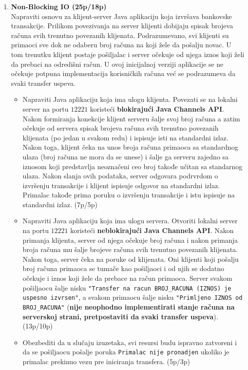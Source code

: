 \documentclass[]{article}
\begin{document}
\begin{enumerate}
\item \textbf{Non-Blocking IO (25p/18p)}
\\Napraviti osnovu za klijent-server Java aplikaciju koja izvr\v{s}ava bankovske transakcije. Prilikom povezivanja na server klijenti dobijaju spisak brojeva ra\v{c}una svih trenutno povezanih klijenata. Podrazumevano, svi klijenti su primaoci sve dok ne odaberu broj ra\v{c}una na koji \v{z}ele da po\v{s}alju novac. U tom trenutku klijent postaje po\v{s}iljalac i server o\v{c}ekuje od njega iznos koji \v{z}eli da prebaci na odredi\v{s}ni ra\v{c}un. U ovoj inicijalnoj verziji aplikacije se ne o\v{c}ekuje potpuna implementacija korisni\v{c}kih ra\v{c}una ve\'c{} se podrazumeva da svaki transfer uspeva.

\begin{itemize}
  \item Napraviti Java aplikaciju koja ima ulogu klijenta. Povezati se na lokalni server na portu $12221$ koristeći \textbf{blokiraju\'c{}i Java Channels API}. Nakon formiranja konekcije klijent serveru \v{s}alje svoj broj ra\v{c}una a zatim o\v{c}ekuje od servera spisak brojeva ra\v{c}una svih trenutno povezanih klijenata (po jedan u svakom redu) i ispisuje isti na standardni izlaz. Nakon toga, klijent \v{c}eka na unos broja ra\v{c}una primaoca sa standardnog ulaza (broj ra\v{c}una ne mora da se unese) i \v{s}alje ga serveru zajedno sa iznosom koji predstavlja neozna\v{c}eni ceo broj takođe u\v{c}itan sa standarnog ulaza. Nakon slanja ovih podataka, server odgovara podrvrdom o izvr\v{s}enju transakcije i klijent ispisuje odgovor na standardni izlaz. Primalac takođe prima poruku o izvr\v{s}enju transakcije i istu ispisuje na standardni izlaz. \hfill (7p/5p)
  \item Napraviti Java aplikaciju koja ima ulogu servera. Otvoriti lokalni server na portu $12221$ koristeći \textbf{neblokiraju\'c{}i Java Channels API}. Nakon primanja klijenta, server od njega o\v{c}ekuje broj ra\v{c}una i nakon primanja broja ra\v{c}una mu \v{s}alje brojeve ra\v{c}una svih trenutno povezanih klijenata. Nakon toga, server \v{c}eka na poruke od klijenata. Oni klijenti koji po\v{s}alju broj ra\v{c}una primaoca se tuma\v{c}e kao po\v{s}iljaoci i od njih se dodatno o\v{c}ekuje i iznos koji \v{z}ele da prebace na ra\v{c}un primaoca. Server svakom po\v{s}iljaocu \v{s}alje nisku \texttt{"Transfer na racun BROJ\_RACUNA (IZNOS) je uspesno izvrsen"}, a svakom primaocu \v{s}alje nisku \texttt{"Primljeno IZNOS od BROJ\_RACUNA"} (\textbf{nije neophodno implementirati stanje ra\v{c}una na serverskoj strani, pretpostaviti da svaki transfer uspeva}). \hfill (13p/10p)
  \item Obezbediti da u slučaju izuzetaka, svi resursi budu ispravno zatvoreni i da se po\v{s}iljaocu po\v{s}alje poruka \texttt{Primalac nije pronadjen} ukoliko je primalac prekinuo vezu pre iniciranja transfera. \hfill (5p/3p)
\end{itemize}


\end{enumerate}
\end{document}
